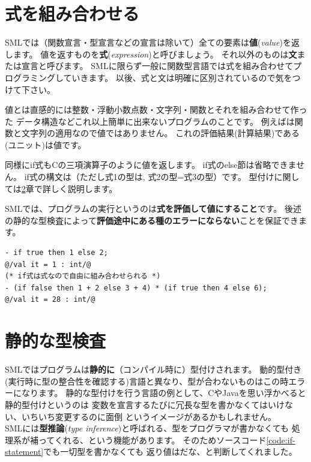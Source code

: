 \documentclass[11pt,a4paper]{article}
\begin{document}
\section{式を組み合わせる}

SMLでは（関数宣言・型宣言などの宣言は除いて）全ての要素は{\bfseries 値}({\itshape value})を返します。
値を返すものを{\bfseries 式}({\itshape expression})と呼びましょう。
それ以外のものは{\bfseries 文}または宣言と呼びます。
SMLに限らず一般に関数型言語では式を組み合わせてプログラミングしていきます。
以後、式と文は明確に区別されているので気をつけて下さい。

値とは直感的には整数・浮動小数点数・文字列・関数とそれを組み合わせて作った
データ構造などこれ以上簡単に出来ないプログラムのことです。
例えばは関数と文字列の適用なので値ではありません。
これの評価結果(計算結果)である\prog{()}(ユニット)は値です。

同様にif式もCの三項演算子のように値を返します。
if式のelse節は省略できません。
if式の構文は（ただし式1の型は, 式2の型=式3の型）です。
型付けに関しては\ref{sec:static-typing}章で詳しく説明します。

SMLでは、プログラムの実行というのは{\bfseries 式を評価して値にすること}です。
後述の静的な型検査によって{\bfseries 評価途中にある種のエラーにならない}ことを保証できます。

\begin{lstlisting}[caption=if文は式,label=code:if-statement]
- if true then 1 else 2;
@/val it = 1 : int/@
(* if式は式なので自由に組み合わせられる *)
- (if false then 1 + 2 else 3 + 4) * (if true then 4 else 6);
@/val it = 28 : int/@
\end{lstlisting}

\section{静的な型検査}
\label{sec:static-typing}

SMLではプログラムは{\bfseries 静的に}（コンパイル時に）型付けされます。
動的型付き(実行時に型の整合性を確認する)言語と異なり、型が合わないものはこの時エラーになります。
静的な型付けを行う言語の例として、CやJavaを思い浮かべると静的型付けというのは
変数を宣言するたびに冗長な型を書かなくてはいけない、いちいち変更するのに面倒
というイメージがあるかもしれません。\\
SMLには{\bfseries 型推論}({\itshape type inference})と呼ばれる、型をプログラマが書かなくても
処理系が補ってくれる、という機能があります。
そのためソースコード\ref{code:if-statement}でも一切型を書かなくても
返り値はだな、と判断してくれました。
\end{document}
